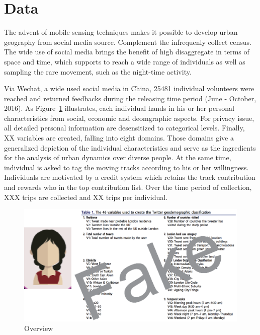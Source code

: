\section{Data}

The advent of mobile sensing techniques makes it possible to develop urban geography from social media source. Complement the infrequenly collect census. 
The wide use of social media brings the benefit of high disaggregate in terms of space and time, which supports to reach a wide range of individuals as well as sampling the rare movement, such as the night-time activity. 

Via Wechat, a wide used social media in China, 25481 individual volunteers were reached and returned feedbacks during the releasing time period (June - October, 2016). As Figure~\ref{fig:data_over} illustrates, each individual hands in his or her personal characteristics from social, economic and deomgraphic aspects. For privacy issue, all detailed personal information are desensitized to categorical levels. Finally, XX variables are created, falling into eight domains. Those domains give a generalized depiction of the individual characteristics and serve as the ingredients for the analysis of urban dynamics over diverse people. At the same time, individual is asked to tag the moving tracks according to his or her willingness. Individuals are motivated by a credit system which retains the track contribution and rewards who in the top contribution list. Over the time period of collection, XXX trips are collected and XX trips per individual. 


\begin{figure}[htb!]
 \centering %
 \includegraphics[width=\columnwidth]{pictures/data_over}
 \caption{Overview}
 \label{fig:data_over}
\end{figure}



